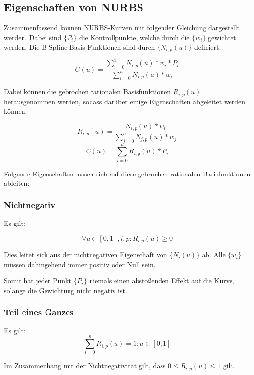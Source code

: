 \documentclass[11pt]{article}
\begin{document}
\subsection{Eigenschaften von NURBS}
Zusammenfassend können NURBS-Kurven mit folgender Gleichung dargestellt werden. 
Dabei sind $\{P_{i}\}$ die Kontrollpunkte, welche durch die $\{w_{i}\}$ gewichtet werden.
Die B-Spline Basis-Funktionen sind durch $\{N_{i,p}(u)\}$ definiert.

\begin{equation}
C(u) = \frac{\sum_{i=0}^{n}N_{i,p}(u)*w_{i}*P_{i}}{\sum_{i=0}^{n}N_{i,p}(u)*w_{i}}
\end{equation}

Dabei können die gebrochen rationalen Basisfunktionen $R_{i,p}(u)$ herausgenommen werden, sodass darüber einige Eigenschaften abgeleitet werden können.

\begin{equation}
R_{i,p}(u) = \frac{N_{i,p}(u)*w_{i}}{\sum_{j=0}^{n}N_{j,p}(u)*w_{j}}
\end{equation}
\begin{equation}
C(u) = \sum_{i=0}^{n}R_{i,p}(u)*P_{i}
\end{equation}

Folgende Eigenschaften lassen sich auf diese gebrochen rationalen Basisfunktionen ableiten:

\subsubsection*{Nichtnegativ}
Es gilt:

\begin{equation}
\forall  u \in [0,1],  i,p : R_{i,p}(u) \geq 0
\end{equation}

Dies leitet sich aus der nichtnegativen Eigenschaft von $\{N_{i}(u)\}$ ab.
Alle $\{w_{i}\}$ müssen dahingehend immer positiv oder Null sein.

Somit hat jeder Punkt $\{P_{i}\}$ niemals einen abstoßenden Effekt auf die Kurve, solange die Gewichtung nicht negativ ist.

\subsubsection*{Teil eines Ganzes}
Es gilt:
\begin{equation}
\sum_{i=0}^{n}R_{i,p}(u) = 1; u \in [0,1]
\end{equation}

Im Zusammenhang mit der Nichtnegativität gilt, dass $0 \leq R_{i,p}(u) \leq 1$ gilt.
\end{document}

